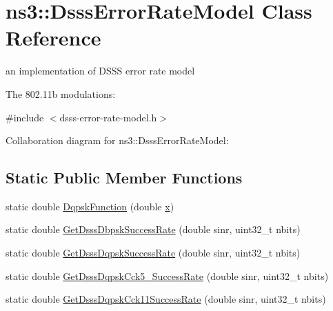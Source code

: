 \hypertarget{classns3_1_1DsssErrorRateModel}{}\section{ns3\+:\+:Dsss\+Error\+Rate\+Model Class Reference}
\label{classns3_1_1DsssErrorRateModel}


an implementation of D\+S\+SS error rate model

The 802.\+11b modulations\+:  




{\ttfamily \#include $<$dsss-\/error-\/rate-\/model.\+h$>$}



Collaboration diagram for ns3\+:\+:Dsss\+Error\+Rate\+Model\+:
\subsection*{Static Public Member Functions}
\begin{DoxyCompactItemize}
\item 
static double \hyperlink{classns3_1_1DsssErrorRateModel_af92549280fdcedac6d4cc697e0992321}{Dqpsk\+Function} (double \hyperlink{lte__link__budget__x2__handover__measures_8m_a9336ebf25087d91c818ee6e9ec29f8c1}{x})
\item 
static double \hyperlink{classns3_1_1DsssErrorRateModel_a3c17f87b4f4c5f8adf8570c96f437fd5}{Get\+Dsss\+Dbpsk\+Success\+Rate} (double sinr, uint32\+\_\+t nbits)
\item 
static double \hyperlink{classns3_1_1DsssErrorRateModel_a40ce71636bd41030cfff29ccea38c588}{Get\+Dsss\+Dqpsk\+Success\+Rate} (double sinr, uint32\+\_\+t nbits)
\item 
static double \hyperlink{classns3_1_1DsssErrorRateModel_a1ec2c9a616b90b2b72871ea48d7d6fb8}{Get\+Dsss\+Dqpsk\+Cck5\+\_\+Success\+Rate} (double sinr, uint32\+\_\+t nbits)
\item 
static double \hyperlink{classns3_1_1DsssErrorRateModel_acce1c4e4eb5b4df017a302b66ec230be}{Get\+Dsss\+Dqpsk\+Cck11\+Success\+Rate} (double sinr, uint32\+\_\+t nbits)
\end{DoxyCompactItemize}
